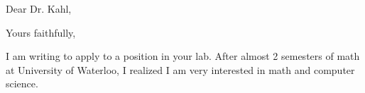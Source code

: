 \documentclass[12pt,a4paper,sans]{moderncv}
\begin{document}
\date{February 26, 2018}
\opening{Dear Dr. Kahl,}
\closing{Yours faithfully,}
\makelettertitle
I am writing to apply to a position in your lab. After almost 2 semesters of math at University of Waterloo, I realized I am very interested in math and computer science. 
\makeletterclosing
\end{document}
